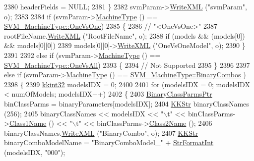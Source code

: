 \begin{DoxyCode}
2380     headerFields = NULL;
2381   \}
2382   svmParam->\hyperlink{class_k_k_m_l_l_1_1_s_v_mparam_a1c5b624f8e72edde7bbe2c48f3b5af8e}{WriteXML} (\textcolor{stringliteral}{"svmParam"}, o);
2383 
2384   \textcolor{keywordflow}{if}  (svmParam->\hyperlink{class_k_k_m_l_l_1_1_s_v_mparam_a30153e00007f9cf65343e0ad97ad61fb}{MachineType} () == \hyperlink{namespace_k_k_m_l_l_ad917464bc631109a3021cf02cd27af9aa2cb1a8e8122853731a8eb99f1bd56630}{SVM\_MachineType::OneVsOne})
2385   \{
2386     \textcolor{comment}{//  "<OneVsOne>"}
2387     rootFileName.\hyperlink{class_k_k_b_1_1_k_k_str_a7de8ac49f70cdcdf2cc31786d23b8a62}{WriteXML} (\textcolor{stringliteral}{"RootFileName"}, o);
2388     \textcolor{keywordflow}{if}  (models  &&  (models[0])  &&  models[0][0])
2389       models[0][0]->\hyperlink{struct_s_v_m233_1_1_svm_model233_ab2d4f8e127af93158ca436d080e80f85}{WriteXML} (\textcolor{stringliteral}{"OneVsOneModel"}, o);
2390   \}
2391 
2392   \textcolor{keywordflow}{else} \textcolor{keywordflow}{if}  (svmParam->\hyperlink{class_k_k_m_l_l_1_1_s_v_mparam_a30153e00007f9cf65343e0ad97ad61fb}{MachineType} () == \hyperlink{namespace_k_k_m_l_l_ad917464bc631109a3021cf02cd27af9aa0bf7132f9ec5b2de535b831afd3ae75c}{SVM\_MachineType::OneVsAll})
2393   \{
2394     \textcolor{comment}{// Not Supported}
2395   \}
2396 
2397   \textcolor{keywordflow}{else} \textcolor{keywordflow}{if}  (svmParam->\hyperlink{class_k_k_m_l_l_1_1_s_v_mparam_a30153e00007f9cf65343e0ad97ad61fb}{MachineType} () == \hyperlink{namespace_k_k_m_l_l_ad917464bc631109a3021cf02cd27af9aa01ad67463554c5f5552dcc6b5f4a553f}{SVM\_MachineType::BinaryCombos}
      )
2398   \{
2399     \hyperlink{namespace_k_k_b_a8fa4952cc84fda1de4bec1fbdd8d5b1b}{kkint32}  modelsIDX = 0;
2400 
2401     \textcolor{keywordflow}{for}  (modelsIDX = 0;  modelsIDX < numOfModels;  modelsIDX++)
2402     \{
2403       \hyperlink{class_k_k_m_l_l_1_1_binary_class_parms}{BinaryClassParmsPtr}  binClassParms = binaryParameters[modelsIDX];
2404       \hyperlink{class_k_k_b_1_1_k_k_str}{KKStr}  binaryClassNames (256);
2405       binaryClassNames << modelsIDX << \textcolor{stringliteral}{"\(\backslash\)t"} << binClassParms->\hyperlink{class_k_k_m_l_l_1_1_binary_class_parms_a2cc986dba48d87b704d539d00fe25c76}{Class1Name} () << \textcolor{stringliteral}{"\(\backslash\)t"}  << 
      binClassParms->\hyperlink{class_k_k_m_l_l_1_1_binary_class_parms_ac587f3be83bd1007dceb8224a977acf9}{Class2Name} ();
2406       binaryClassNames.\hyperlink{class_k_k_b_1_1_k_k_str_a7de8ac49f70cdcdf2cc31786d23b8a62}{WriteXML} (\textcolor{stringliteral}{"BinaryCombo"}, o);
2407       \hyperlink{class_k_k_b_1_1_k_k_str}{KKStr}  binaryComboModelName = \textcolor{stringliteral}{"BinaryComboModel\_"} + \hyperlink{namespace_k_k_b_ae3bde258fa036604fac8bdb0277ab46e}{StrFormatInt} (modelsIDX, \textcolor{stringliteral}{"000"});

\end{DoxyCode}
